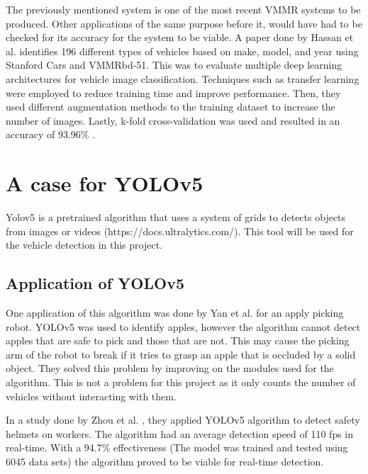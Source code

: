 	The previously mentioned system is one of the most recent VMMR systems to be produced. Other applications of the same purpose before it, would have had to be checked for its accuracy for the system to be viable. A paper done by Hassan et al. \citeyear{Hassan2021} identifies 196 different types of vehicles based on make, model, and year using Stanford Cars and VMMRbd-51. This was to evaluate multiple deep learning architectures for vehicle image classification. Techniques such as transfer learning were employed to reduce training time and improve performance. Then, they used different augmentation methods to the training dataset to increase the number of images. Lastly, k-fold cross-validation was used and resulted in an accuracy of 93.96\% .




\section{A case for YOLOv5}
	Yolov5 is a pretrained algorithm that uses a system of grids to detects objects from images or videos (https://docs.ultralytics.com/). This tool will be used for the vehicle detection in this project. 

\subsection{Application of YOLOv5}
One application of this algorithm was done by Yan et al. \citeyear{yan_2021} for an apply picking robot. YOLOv5 was used to identify apples, however the algorithm cannot detect apples that are safe to pick and those that are not. This may cause the picking arm of the robot to break if it tries to grasp an apple that is occluded by a solid object. They solved this problem by improving on the modules used for the algorithm. This is not a problem for this project as it only counts the number of vehicles without interacting with them. 

In a study done by Zhou et al. \citeyear{zhou_2021}, they applied YOLOv5 algorithm to detect safety helmets on workers. The algorithm had an average detection speed of 110 fps in real-time. With a 94.7\% effectiveness (The model was trained and tested  using 6045 data sets) the algorithm proved to be viable for real-time detection.

